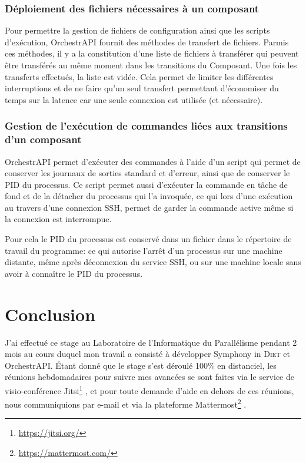 \documentclass{article}
\newcommand{\LIP}{Laboratoire de l'Informatique du Parallélisme\xspace}
\newcommand{\diet}{\textsc{Diet}\xspace} %
\newcommand{\symphonyind}{Symphony in \diet} %
\newcommand{\orchestrapi}{OrchestrAPI\xspace}
\begin{document}
\subsubsection{Déploiement des fichiers nécessaires à un composant}
Pour permettre la gestion de fichiers de configuration ainsi que les scripts
d'exécution, \orchestrapi fournit des méthodes de transfert de fichiers. Parmis
ces méthodes, il y a la constitution d'une liste de fichiers à transférer qui
peuvent être transférés au même moment dans les transitions du Composant. Une
fois les transferts effectués, la liste est vidée. Cela permet de limiter les
différentes interruptions et de ne faire qu'un seul transfert permettant
d'économiser du temps sur la latence car une seule connexion est utilisée (et
nécessaire).

\subsubsection{Gestion de l'exécution de commandes liées aux transitions d'un
composant}
\orchestrapi permet d'exécuter des commandes à l'aide d'un script qui permet de
conserver les journaux de sorties standard et d'erreur, ainsi que de conserver
le PID du processus. Ce script permet aussi d'exécuter la commande en tâche de
fond et de la détacher du processus qui l'a invoquée, ce qui lors d'une
exécution au travers d'une connexion SSH, permet de garder la commande active
même si la connexion est interrompue.

Pour cela le PID du processus est conservé dans un fichier dans le répertoire de
travail du programme: ce qui autorise l'arrêt d'un processus sur une machine
distante, même après déconnexion du service SSH, ou sur une machine locale sans
avoir à connaître le PID du processus.


\section{Conclusion}

J'ai effectué ce stage au \LIP pendant 2 mois au cours duquel mon travail a
consisté à développer \symphonyind et \orchestrapi.  Étant donné que le stage
s'est déroulé 100\% en distanciel, les réunions hebdomadaires pour suivre mes
avancées se sont faites via le service de visio-conférence \og
Jitsi\footnote{\url{https://jitsi.org/}} \fg , et pour toute demande d'aide en
dehors de ces réunions, nous communiquions par e-mail et via la plateforme \og
Mattermost\footnote{\url{https://mattermost.com/}} \fg.\newline
\end{document}
